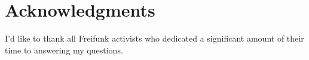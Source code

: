 \section{Acknowledgments}
I'd like to thank all Freifunk activists who dedicated a significant amount of their time to answering my questions.
